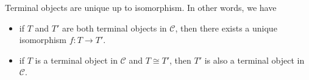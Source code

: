 \documentclass[12pt,twoside,a4paper]{report}
\theoremstyle{definition}
\newtheorem*{definition*}{Definition}
\begin{document}
        Terminal objects are unique up to isomorphism. In other words, we have
        \begin{itemize}
            \item 
                if $T$ and $T'$ are both terminal objects in $\mathcal{C}$, then there exists a unique isomorphism $f : T \to T'$.
            \item
                if $T$ is a terminal object in $\mathcal{C}$ and $T \cong T'$, then $T'$ is also a terminal object in $\mathcal{C}$.
        \end{itemize}

\end{document}

